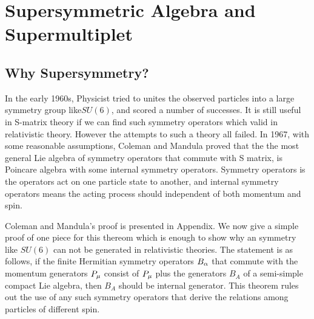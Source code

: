 \chapter{Supersymmetric Algebra and Supermultiplet}

\section{Why Supersymmetry?}
    In the early 1960s, Physicist tried to unites the observed particles into a large symmetry group like$ SU(6)$, and scored a number of successes. It is still useful in S-matrix theory if we can find such symmetry operators which valid in relativistic theory. However the attempts to such a theory all failed. 
    In 1967, with some reasonable assumptions, Coleman and Mandula proved that the the most general Lie algebra of symmetry operators that commute with S matrix, is Poincare algebra with some internal symmetry operators.
    Symmetry operators is the operators act on one particle state to another, and internal symmetry operators means the acting process should independent of both momentum and spin.
    
    Coleman and Mandula's proof is presented in Appendix. We now give a simple proof of one piece for this thereom which is enough to show why an symmetry like $SU(6)$ can not be generated in relativistic theories. The statement is as follows, if the finite Hermitian symmetry operators $B_{\alpha}$ that commute with the momentum generators $P_\mu$ consist of $P_\mu$ plus the generators $B_{A}$ of a semi-simple compact Lie algebra, then $B_A$ should be internal generator. This theorem rules out the use of any such symmetry operators that derive the relations among particles of different spin.  
    
